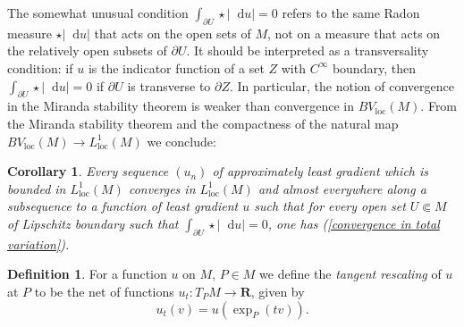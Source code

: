 \documentclass[reqno,10pt]{amsart}
\newcommand{\RR}{\mathbf{R}}
\newcommand*\dif{\mathop{}\!\mathrm{d}}
\newcommand{\dfn}[1]{\emph{#1}\index{#1}}
\newcommand{\loc}{\mathrm{loc}}
\newtheorem{corollary}[theorem]{Corollary}
\theoremstyle{definition}
\newtheorem{definition}[theorem]{Definition}
\numberwithin{equation}{section}
\begin{document}
The somewhat unusual condition $\int_{\partial U} \star |\dif u| = 0$ refers to the same Radon measure $\star |\dif u|$ that acts on the open sets of $M$, not on a measure that acts on the relatively open subsets of $\partial U$.
It should be interpreted as a transversality condition: if $u$ is the indicator function of a set $Z$ with $C^\infty$ boundary, then $\int_{\partial U} \star |\dif u| = 0$ if $\partial U$ is transverse to $\partial Z$.
In particular, the notion of convergence in the Miranda stability theorem is weaker than convergence in $BV_\loc(M)$.
From the Miranda stability theorem and the compactness of the natural map $BV_\loc(M) \to L^1_\loc(M)$ we conclude:

\begin{corollary}\label{compactness}
Every sequence $(u_n)$ of approximately least gradient which is bounded in $L^1_\loc(M)$ converges in $L^1_\loc(M)$ and almost everywhere along a subsequence to a function of least gradient $u$ such that for every open set $U \Subset M$ of Lipschitz boundary such that $\int_{\partial U} \star |\dif u| = 0$, one has (\ref{convergence in total variation}).
\end{corollary}

\begin{definition}
For a function $u$ on $M$, $P \in M$ we define the \dfn{tangent rescaling} of $u$ at $P$ to be the net of functions $u_t: T_PM \to \RR$, given by
$$u_t(v) = u\left(\exp_P(tv)\right).$$
\end{definition}
\end{document}
